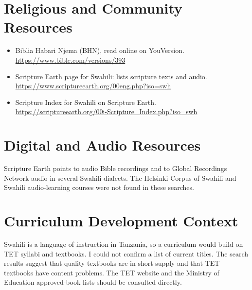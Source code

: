 \documentclass[12pt]{article}
\begin{document}
\section{Religious and Community Resources}
\begin{itemize}
\item Biblia Habari Njema (BHN), read online on YouVersion. \url{https://www.bible.com/versions/393}
\item Scripture Earth page for Swahili: lists scripture texts and audio. \url{https://www.scriptureearth.org/00eng.php?iso=swh}
\item Scripture Index for Swahili on Scripture Earth. \url{https://scriptureearth.org/00i-Scripture_Index.php?iso=swh}
\end{itemize}

\section{Digital and Audio Resources}
Scripture Earth points to audio Bible recordings and to Global Recordings Network audio in several Swahili dialects. The Helsinki Corpus of Swahili and Swahili audio-learning courses were not found in these searches.

\section{Curriculum Development Context}
Swahili is a language of instruction in Tanzania, so a curriculum would build on TET syllabi and textbooks. I could not confirm a list of current titles. The search results suggest that quality textbooks are in short supply and that TET textbooks have content problems. The TET website and the Ministry of Education approved-book lists should be consulted directly.
\end{document}
